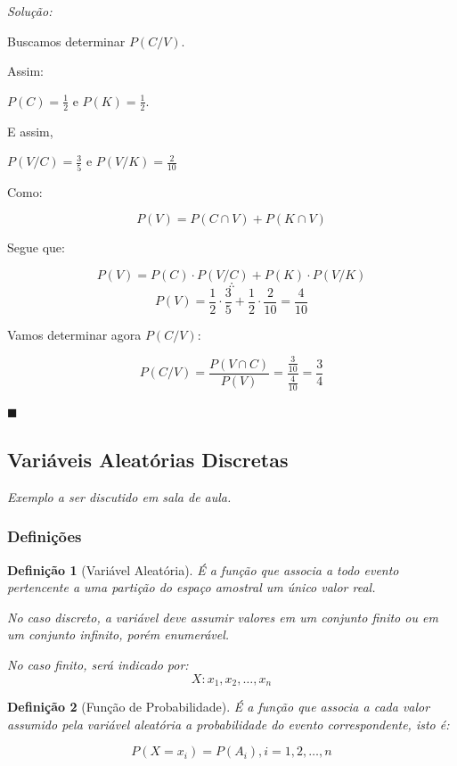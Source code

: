 \documentclass[oneside,a4paper,12pt]{article}
\newtheorem{definition}{Definição}[section]
\begin{document}
{\it Solução:}

Buscamos determinar $P(C/V)$.

Assim:

$P(C) = \displaystyle \frac{1}{2}$ e $P(K) = \displaystyle \frac{1}{2}$.

E assim,

$P(V/C) = \displaystyle \frac{3}{5}$ e $P(V/K) = \displaystyle \frac{2}{10}$

Como:

$$P(V) = P(C \cap V) + P(K \cap V)$$

Segue que:

$$P(V) = P(C) \cdot P(V/C) + P(K) \cdot P(V/K)$$
$$\therefore$$
$$P(V) = \displaystyle \frac{1}{2}\cdot \displaystyle \frac{3}{5} + \displaystyle \frac{1}{2} \cdot \displaystyle \frac{2}{10} = \displaystyle \frac{4}{10}$$

Vamos determinar agora $P(C/V)$:

$$P(C/V) = \frac{P(V \cap C)}{P(V)} = \frac{\frac{3}{10}}{\frac{4}{10}} = \frac{3}{4}$$

\begin{flushright}
	$\blacksquare$
\end{flushright}

\subsection{Variáveis Aleatórias Discretas}

\begin{center}
	{\it Exemplo a ser discutido em sala de aula.}
\end{center}

\subsubsection{Definições}

\begin{definition}[Variável Aleatória]
	É a função que associa a todo evento pertencente a uma partição do espaço amostral um único valor real.
	
	No caso discreto, a variável deve assumir valores em um conjunto finito ou em um conjunto infinito, porém enumerável.
	
	No caso finito, será indicado por:
	$$X: x_1,x_2,\dots,x_n$$
\end{definition}

\begin{definition}[Função de Probabilidade]
	É a função que associa a cada valor assumido pela variável aleatória a probabilidade do evento correspondente, isto é:
	
	$$P(X=x_i) = P(A_i),i=1,2,\dots,n$$
	
\end{definition}
\end{document}
